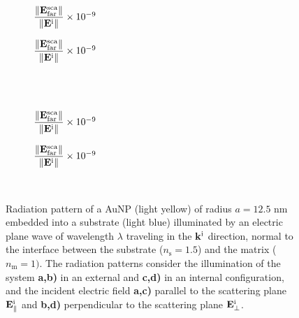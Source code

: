 \begin{figure}[b!]
    \centering
    \def\svgwidth{.8\textwidth}
    \hspace*{-.215\textwidth}%
    \vspace*{-.5em}%
        \begin{subfigure}{.32\textwidth}\caption{\footnotesize$\dfrac{\norm{\vb{E}^\text{sca}_\text{far}}}{\norm{\vb{E}^\text{i}}} \times 10^{-9}$  }\label{sfig:Far:Emb:Norm:a}\end{subfigure}%
        \begin{subfigure}{.4\textwidth}\caption{\footnotesize$\dfrac{\norm{\vb{E}^\text{sca}_\text{far}}}{\norm{\vb{E}^\text{i}}} \times 10^{-9}$  }\label{sfig:Far:Emb:Norm:b}\end{subfigure}\\
    \\
    \def\svgwidth{.8\textwidth}
    \hspace*{-.215\textwidth}%
    \vspace*{-.5em}%
        \begin{subfigure}{.32\textwidth}\caption{\footnotesize$\dfrac{\norm{\vb{E}^\text{sca}_\text{far}}}{\norm{\vb{E}^\text{i}}} \times 10^{-9}$  }\label{sfig:Far:Emb:Norm:c}\end{subfigure}%
        \begin{subfigure}{.4\textwidth}\caption{\footnotesize$\dfrac{\norm{\vb{E}^\text{sca}_\text{far}}}{\norm{\vb{E}^\text{i}}} \times 10^{-9}$  }\label{sfig:Far:Emb:Norm:d}\end{subfigure}\\
    \caption[ Radiation pattern of a AuNP totally embedded into a substrate illuminated at normal incidence ]{Radiation pattern of a AuNP (light yellow) of radius $a = 12.5$ nm embedded into a substrate (light blue) illuminated by an electric plane wave of  wavelength $\lambda$ traveling in the $\vb{k}^\text{i}$ direction, normal to the interface between the substrate ($n_\text{s} = 1.5$) and the matrix ($n_\text{m} = 1)$. The radiation patterns consider the illumination of the system  \textbf{a,b)} in an external and  \textbf{c,d)} in an internal configuration, and the incident electric field \textbf{a,c)} parallel to the scattering plane $\vb{E}^\text{i}_\parallel$ and \textbf{b,d)} perpendicular to the scattering plane $\vb{E}^\text{i}_\perp$.}
    \label{fig:Far:Emb:Norm}
\end{figure}


